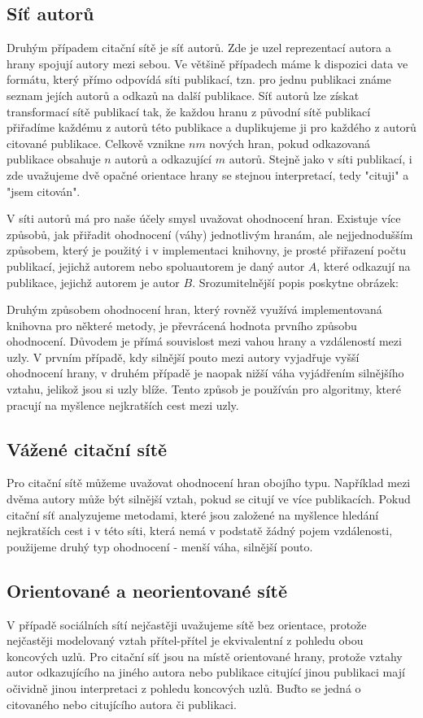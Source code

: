 \documentclass[12pt,titlepage]{report}
\begin{document}
\subsection{Síť autorů}
Druhým případem citační sítě je síť autorů. Zde je uzel reprezentací autora a
hrany spojují autory mezi sebou. Ve většině případech máme k dispozici data ve
formátu, který přímo odpovídá síti publikací, tzn. pro jednu publikaci známe
seznam jejích autorů a odkazů na další publikace. Síť autorů lze získat
transformací sítě publikací tak, že každou hranu z původní sítě publikací
přiřadíme každému z autorů této publikace a duplikujeme ji pro každého z autorů
citované publikace. Celkově vznikne $nm$ nových hran, pokud odkazovaná
publikace obsahuje $n$ autorů a odkazující $m$ autorů. Stejně jako v síti
publikací, i zde uvažujeme dvě opačné orientace hrany se stejnou interpretací,
tedy "cituji" a "jsem citován". 

V síti autorů má pro naše účely smysl uvažovat ohodnocení hran. Existuje více
způsobů, jak přiřadit ohodnocení (váhy) jednotlivým hranám, ale nejjednodušším
způsobem, který je použitý i v implementaci knihovny, je prosté přiřazení počtu
publikací, jejichž autorem nebo spoluautorem je daný autor $A$, které odkazují
na publikace, jejichž autorem je autor $B$. Srozumitelnější popis poskytne
obrázek:

Druhým způsobem ohodnocení hran, který rovněž využívá implementovaná knihovna
pro některé metody, je převrácená hodnota prvního způsobu ohodnocení. Důvodem
je přímá souvislost mezi vahou hrany a vzdáleností mezi uzly. V prvním případě,
kdy silnější pouto mezi autory vyjadřuje vyšší ohodnocení hrany, v druhém
případě je naopak nižší váha vyjádřením silnějšího vztahu, jelikož jsou si uzly
blíže. Tento způsob je používán pro algoritmy, které pracují na myšlence
nejkratších cest mezi uzly. 

\subsection{Vážené citační sítě}

Pro citační sítě můžeme uvažovat ohodnocení hran obojího typu. Například mezi
dvěma autory může být silnější vztah, pokud se citují ve více publikacích.
Pokud citační síť analyzujeme metodami, které jsou založené na myšlence hledání
nejkratších cest i v této síti, která nemá v podstatě žádný pojem vzdálenosti,
použijeme druhý typ ohodnocení - menší váha, silnější pouto.


\subsection{Orientované a neorientované sítě}
V případě sociálních sítí nejčastěji uvažujeme sítě bez orientace, protože
nejčastěji modelovaný vztah přítel-přítel je ekvivalentní z pohledu obou
koncových uzlů. Pro citační síť jsou na místě orientované hrany, protože vztahy
autor odkazujícího na jiného autora nebo publikace citující jinou publikaci
mají očividně jinou interpretaci z pohledu koncových uzlů. Buďto se jedná o
citovaného nebo citujícího autora či publikaci.
\end{document}
